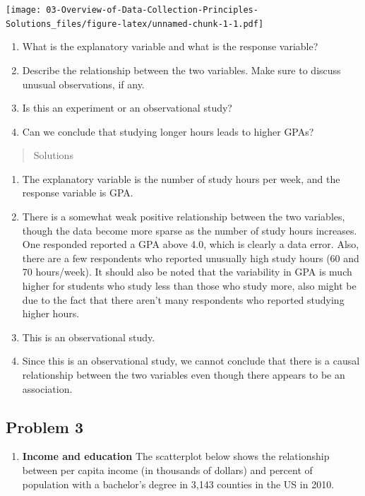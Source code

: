 \documentclass[
]{book}
\providecommand{\tightlist}{%
  \setlength{\itemsep}{0pt}\setlength{\parskip}{0pt}}
\begin{document}
\texttt{[image: 03-Overview-of-Data-Collection-Principles-Solutions\_files/figure-latex/unnamed-chunk-1-1.pdf]}

\begin{enumerate}
\def\labelenumi{\alph{enumi}.}
\tightlist
\item
  What is the explanatory variable and what is the response variable?
\item
  Describe the relationship between the two variables. Make sure to discuss unusual observations, if any.
\item
  Is this an experiment or an observational study?
\item
  Can we conclude that studying longer hours leads to higher GPAs?
\end{enumerate}

\begin{quote}
Solutions
\end{quote}

\begin{enumerate}
\def\labelenumi{\alph{enumi}.}
\tightlist
\item
  The explanatory variable is the number of study hours per week, and the response variable is GPA.
\item
  There is a somewhat weak positive relationship between the two variables, though the data become more sparse as the number of study hours increases. One responded reported a GPA above 4.0, which is clearly a data error. Also, there are a few respondents who reported unusually high study hours (60 and 70 hours/week). It should also be
  noted that the variability in GPA is much higher for students who study less than those who study more, also might be due to the fact that there aren't many respondents who reported studying higher hours.
\item
  This is an observational study.
\item
  Since this is an observational study, we cannot conclude that there is a causal relationship between the two variables even though there appears to be an association.
\end{enumerate}

\pagebreak

\hypertarget{problem-3}{%
\subsection{Problem 3}\label{problem-3}}

\begin{enumerate}
\def\labelenumi{\arabic{enumi}.}
\setcounter{enumi}{2}
\tightlist
\item
  \textbf{Income and education} The scatterplot below shows the relationship between per capita income (in thousands of dollars) and percent of population with a bachelor's degree in 3,143 counties in the US in 2010.
\end{enumerate}
\end{document}
